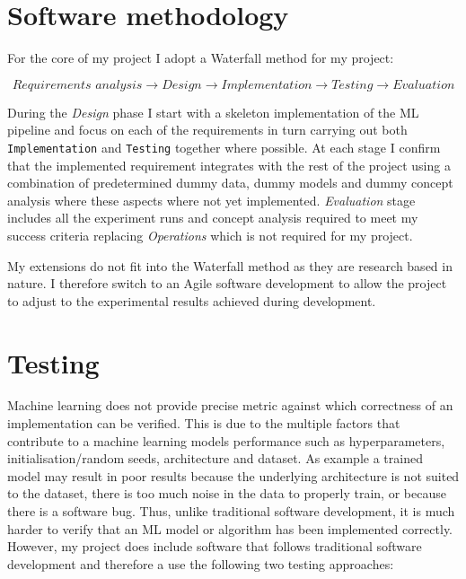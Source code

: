 

\section{Software methodology}


For the core of my project I adopt a Waterfall method  for my project:

\begin{equation*}
    \textit{Requirements analysis} \longrightarrow \textit{Design} \longrightarrow \textit{Implementation} \longrightarrow \textit{Testing} \longrightarrow \textit{Evaluation}
\end{equation*}

During the \textit{Design} phase I start with a skeleton implementation of the ML pipeline and focus on each of the requirements in turn carrying out both \texttt{Implementation} and \texttt{Testing} together where possible.
At each stage I confirm that the implemented requirement integrates with the rest of the project using a combination of predetermined dummy data, dummy models and dummy concept analysis where these aspects where not yet implemented.
\textit{Evaluation} stage includes all the experiment runs and concept analysis required to meet my success criteria replacing \textit{Operations} which is not required for my project.

My extensions do not fit into the Waterfall method as they are research based in nature. I therefore switch to an Agile software development  to allow the project to adjust to the experimental results achieved during development.

\section{Testing}
\label{sec:testing}


Machine learning does not provide precise metric against which correctness of an implementation can be verified.
This is due to the multiple factors that contribute to a machine learning models performance such as hyperparameters, initialisation/random seeds, architecture and dataset.
As example a trained model may result in poor results because the underlying architecture is not suited to the dataset, there is too much noise in the data to properly train, or because there is a software bug.
Thus, unlike traditional software development, it is much harder to verify that an ML model or algorithm has been implemented correctly.
However, my project does include software that follows traditional software development and therefore a use the following two testing approaches:

